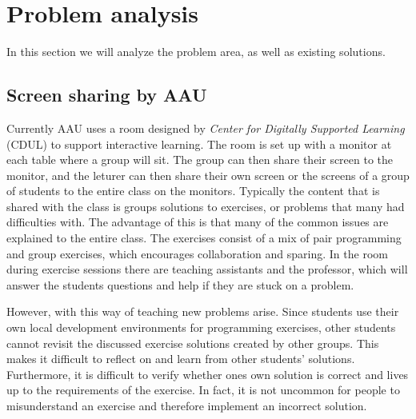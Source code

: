 \section{Problem analysis}
In this section we will analyze the problem area, as well as existing solutions. 

\subsection*{Screen sharing by AAU}
Currently AAU uses a room designed by \textit{Center for Digitally Supported Learning} (CDUL) to support interactive learning. 
The room is set up with a monitor at each table where a group will sit. The group can then share their screen to the monitor, and the leturer can then share their own screen or the screens of a group of students to the entire class on the monitors. 
Typically the content that is shared with the class is groups solutions to exercises, or problems that many had difficulties with.
The advantage of this is that many of the common issues are explained to the entire class.
The exercises consist of a mix of pair programming and group exercises, which encourages collaboration and sparing.
In the room during exercise sessions there are teaching assistants and the professor, which will answer the students questions and help if they are stuck on a problem. 


However, with this way of teaching new problems arise.
Since students use their own local development environments for programming exercises, other students cannot revisit the discussed exercise solutions created by other groups. This makes it difficult to reflect on and learn from other students' solutions.
Furthermore, it is difficult to verify whether ones own solution is correct and lives up to the requirements of the exercise.
In fact, it is not uncommon for people to misunderstand an exercise and therefore implement an incorrect solution.

